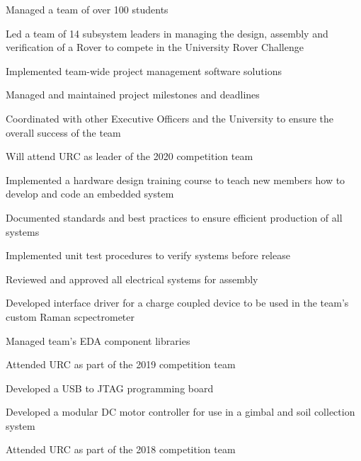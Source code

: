\documentclass[]{deedy-resume-openfont}
\begin{document}
\begin{minipage}[t]{0.66\textwidth}
\begin{tightemize}
	\item Managed a team of over 100 students
	\item Led a team of 14 subsystem leaders in managing the design, assembly and verification of a Rover to compete in the University Rover Challenge
	\item Implemented team-wide project management software solutions
	\item Managed and maintained project milestones and deadlines
	\item Coordinated with other Executive Officers and the University to ensure the overall success of the team
	\item Will attend URC as leader of the 2020 competition team
\end{tightemize}
\begin{tightemize}
	\item Implemented a hardware design training course to teach new members how to develop and code an embedded system
	\item Documented standards and best practices to ensure efficient production of all systems
	\item Implemented unit test procedures to verify systems before release
	\item Reviewed and approved all electrical systems for assembly
	\item Developed interface driver for a charge coupled device to be used in the team's custom Raman scpectrometer
	\item Managed team's EDA component libraries
	\item Attended URC as part of the 2019 competition team
\end{tightemize}
\begin{tightemize}
	\item Developed a USB to JTAG programming board
	\item Developed a modular DC motor controller for use in a gimbal and soil collection system
	\item Attended URC as part of the 2018 competition team
\end{tightemize}
\sectionsep


\end{minipage}
\end{document}
